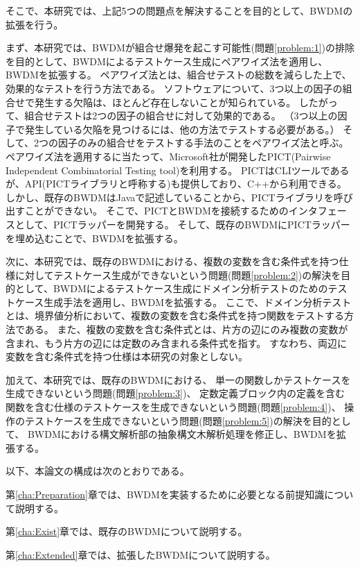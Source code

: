 \documentclass[uplatex, report, a4j, 10pt]{jsbook}
\newcommand{\tool}{BWDM}
\begin{document}
そこで、本研究では、上記5つの問題点を解決することを目的として、BWDMの拡張を行う。

まず、本研究では、BWDMが組合せ爆発を起こす可能性(問題\ref{problem:1})の排除を目的として、BWDMによるテストケース生成にペアワイズ法を適用し、BWDMを拡張する。
ペアワイズ法とは、組合せテストの総数を減らした上で、効果的なテストを行う方法である\cite{pairwise}。
ソフトウェアについて、3つ以上の因子の組合せで発生する欠陥は、ほとんど存在しないことが知られている\cite{over3fact}。
したがって、組合せテストは2つの因子の組合せに対して効果的である。
（3つ以上の因子で発生している欠陥を見つけるには、他の方法でテストする必要がある。）
そして、2つの因子のみの組合せをテストする手法のことをペアワイズ法と呼ぶ。
ペアワイズ法を適用するに当たって、Microsoft社が開発したPICT(Pairwise Independent Combinatorial Testing tool)\cite{pict}を利用する。
PICTはCLIツールであるが、API(PICTライブラリと呼称する)も提供しており、C++から利用できる。
しかし、既存のBWDMはJavaで記述していることから、PICTライブラリを呼び出すことができない。
そこで、PICTとBWDMを接続するためのインタフェースとして、PICTラッパーを開発する。
そして、既存のBWDMにPICTラッパーを埋め込むことで、BWDMを拡張する。

次に、本研究では、既存のBWDMにおける、複数の変数を含む条件式を持つ仕様に対してテストケース生成ができないという問題(問題\ref{problem:2})の解決を目的として、BWDMによるテストケース生成にドメイン分析テストのためのテストケース生成手法を適用し、BWDMを拡張する。
ここで、ドメイン分析テスト\cite{izon}\cite{istqb}とは、境界値分析において、複数の変数を含む条件式を持つ関数をテストする方法である。
また、複数の変数を含む条件式とは、片方の辺にのみ複数の変数が含まれ、もう片方の辺には定数のみ含まれる条件式を指す。
すなわち、両辺に変数を含む条件式を持つ仕様は本研究の対象としない。

加えて、本研究では、既存のBWDMにおける、
単一の関数しかテストケースを生成できないという問題(問題\ref{problem:3})、
定数定義ブロック内の定義を含む関数を含む仕様のテストケースを生成できないという問題(問題\ref{problem:4})、
操作のテストケースを生成できないという問題(問題\ref{problem:5})の解決を目的として、
BWDMにおける構文解析部の抽象構文木解析処理を修正し、BWDMを拡張する。

以下、本論文の構成は次のとおりである。

第\ref{cha:Preparation}章では、\tool{}を実装するために必要となる前提知識について説明する。

第\ref{cha:Exist}章では、既存の\tool{}について説明する。

第\ref{cha:Extended}章では、拡張した\tool{}について説明する。
\end{document}
